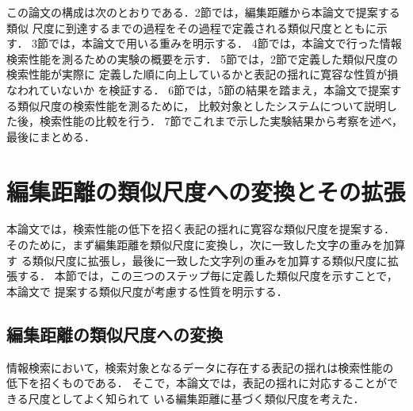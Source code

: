 この論文の構成は次のとおりである．2節では，編集距離から本論文で提案する類似
尺度に到達するまでの過程をその過程で定義される類似尺度とともに示す．
3節では，本論文で用いる重みを明示する．
4節では，本論文で行った情報検索性能を測るための実験の概要を示す．
5節では，2節で定義した類似尺度の検索性能が実際に
定義した順に向上しているかと表記の揺れに寛容な性質が損なわれていないか
を検証する．
6節では，5節の結果を踏まえ，本論文で提案する類似尺度の検索性能を測るために，
比較対象としたシステムについて説明した後，検索性能の比較を行う．
7節でこれまで示した実験結果から考察を述べ，最後にまとめる．

\section{編集距離の類似尺度への変換とその拡張}

本論文では，検索性能の低下を招く表記の揺れに寛容な類似尺度を提案する．
そのために，まず編集距離を類似尺度に変換し，次に一致した文字の重みを加算す
る類似尺度に拡張し，最後に一致した文字列の重みを加算する類似尺度に拡張する．
本節では，この三つのステップ毎に定義した類似尺度を示すことで，本論文で
提案する類似尺度が考慮する性質を明示する．

\subsection{編集距離の類似尺度への変換}

情報検索において，検索対象となるデータに存在する表記の揺れは検索性能の
低下を招くものである．
そこで，本論文では，表記の揺れに対応することができる尺度としてよく知られて
いる編集距離に基づく類似尺度を考えた．

